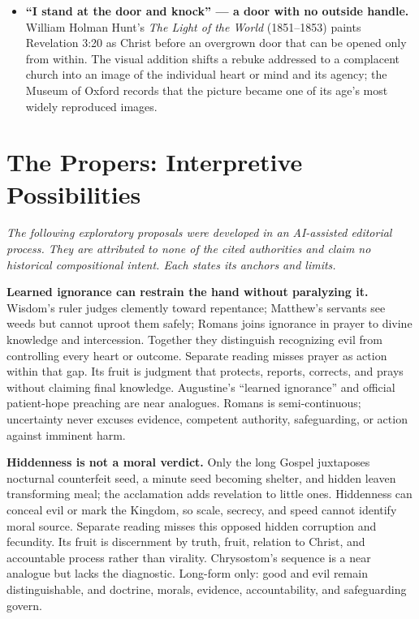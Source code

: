 \begin{deepstudy}
{\begin{itemize}
\item \textbf{“I stand at the door and knock” --- a door with no outside handle.\enspace{}} William Holman Hunt's \emph{The Light of the World} (1851--1853) paints Revelation 3:20 as Christ before an overgrown door that can be opened only from within. The visual addition shifts a rebuke addressed to a complacent church into an image of the individual heart or mind and its agency; the Museum of Oxford records that the picture became one of its age's most widely reproduced images.

\end{itemize}
}

\section*{The Propers: Interpretive Possibilities}

\noindent\emph{The following exploratory proposals were developed in an AI-assisted editorial process. They are attributed to none of the cited authorities and claim no historical compositional intent. Each states its anchors and limits.}

\noindent\textbf{Learned ignorance can restrain the hand without paralyzing it.\enspace{}}
Wisdom's ruler judges clemently toward repentance; Matthew's servants see weeds but cannot uproot them safely; Romans joins ignorance in prayer to divine knowledge and intercession. Together they distinguish recognizing evil from controlling every heart or outcome. Separate reading misses prayer as action within that gap. Its fruit is judgment that protects, reports, corrects, and prays without claiming final knowledge. Augustine's “learned ignorance” and official patient-hope preaching are near analogues. Romans is semi-continuous; uncertainty never excuses evidence, competent authority, safeguarding, or action against imminent harm.

\noindent\textbf{Hiddenness is not a moral verdict.\enspace{}}
Only the long Gospel juxtaposes nocturnal counterfeit seed, a minute seed becoming shelter, and hidden leaven transforming meal; the acclamation adds revelation to little ones. Hiddenness can conceal evil or mark the Kingdom, so scale, secrecy, and speed cannot identify moral source. Separate reading misses this opposed hidden corruption and fecundity. Its fruit is discernment by truth, fruit, relation to Christ, and accountable process rather than virality. Chrysostom's sequence is a near analogue but lacks the diagnostic. Long-form only: good and evil remain distinguishable, and doctrine, morals, evidence, accountability, and safeguarding govern.


\end{deepstudy}
